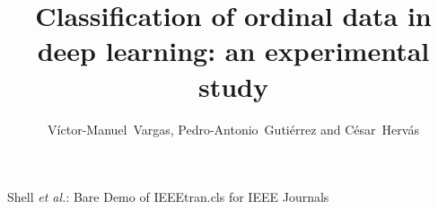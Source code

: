 \documentclass[journal]{IEEEtran}
\begin{document}
	\title{Classification of ordinal data in deep learning: an experimental study}
	
	\author{Víctor-Manuel~Vargas, Pedro-Antonio~Gutiérrez and César~Hervás}
	
	
	
	
	{Shell \MakeLowercase{\textit{et al.}}: Bare Demo of IEEEtran.cls for IEEE Journals}
	
\end{document}
